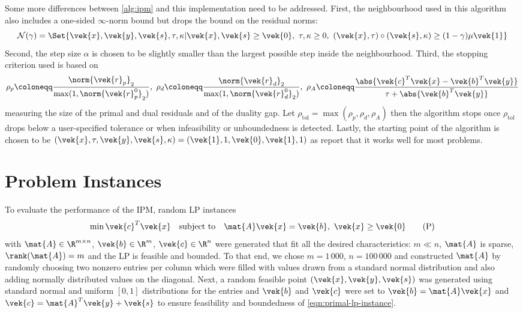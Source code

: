 Some more differences between \cref{alg:ipm} and this implementation need to be addressed.
First, the neighbourhood used in this algorithm also includes a one-sided \(\infty\)-norm bound but drops the bound on the residual norms:
\begin{equation}
  \mathcal{N}(\gamma) = \Set{ \vek{x}, \vek{y}, \vek{s}, \tau, \kappa | \vek{x}, \vek{s} \geq \vek{0}, \ \tau, \kappa \geq 0, \ (\vek{x}, \tau) \circ (\vek{s}, \kappa) \geq (1-\gamma) \mu \vek{1} }
\end{equation}
Second, the step size \(\alpha\) is chosen to be slightly smaller than the largest possible step inside the neighbourhood.
Third, the stopping criterion used is based on 
\begin{equation}
  \rho_p \coloneqq \frac{\norm{\vek{r}_p}_2}{\max(1, \norm{\vek{r}^0_p}_2)}, \ 
  \rho_d \coloneqq \frac{\norm{\vek{r}_d}_2}{\max(1, \norm{\vek{r}^0_d}_2)}, \ 
  \rho_A \coloneqq \frac{\abs{\vek{c}^T\vek{x} - \vek{b}^T \vek{y}}}{\tau + \abs{\vek{b}^T\vek{y}}}
\end{equation}
measuring the size of the primal and dual residuals and of the duality gap.
Let \(\rho_{\mathrm{tol}} = \max(\rho_p, \rho_d, \rho_A)\) then the algorithm stops once \(\rho_{\mathrm{tol}}\) drops below a user-specified tolerance or when infeasibility or unboundedness is detected.
Lastly, the starting point of the algorithm is chosen to be \((\vek{x}, \tau, \vek{y}, \vek{s}, \kappa) = (\vek{1}, 1, \vek{0}, \vek{1}, 1)\) as \textcite{AndersenAndersen-MosekInteriorPointMethod} report that it works well for most problems.

\section{Problem Instances}

To evaluate the performance of the IPM, random LP instances 
\begin{equation}\label{eqn:primal-lp-instance}
  \min \vek{c}^T \vek{x} \quad \text{subject to} \quad \mat{A}\vek{x} = \vek{b}, \ \vek{x} \geq \vek{0} \tag{P}
 \end{equation}
with \(\mat{A} \in \R^{m \times n}\), \(\vek{b} \in \R^m\), \(\vek{c} \in \R^n\) were generated that fit all the desired characteristics: \(m \ll n\), \(\mat{A}\) is sparse, \(\rank(\mat{A}) = m\) and the LP is feasible and bounded.
To that end, we chose \(m = 1\,000\), \(n = 100\,000\) and constructed \(\mat{A}\) by randomly choosing two nonzero entries per column which were filled with values drawn from a standard normal distribution and also adding normally distributed values on the diagonal.
Next, a random feasible point \((\vek{x}, \vek{y}, \vek{s})\) was generated using standard normal and uniform \([0, 1]\) distributions for the entries and \(\vek{b}\) and \(\vek{c}\) were set to \(\vek{b} = \mat{A} \vek{x}\) and \(\vek{c} = \mat{A}^T \vek{y} + \vek{s}\) to ensure feasibility and boundedness of \cref{eqn:primal-lp-instance}.

